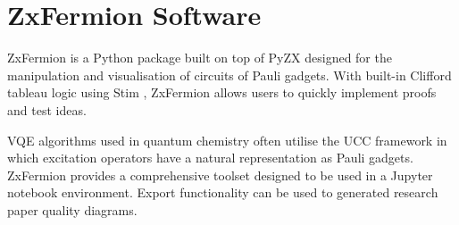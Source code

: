 \chapter{ZxFermion Software}

ZxFermion is a Python package built on top of PyZX \cite{Kissinger2020} designed for the manipulation and visualisation of circuits of Pauli gadgets. With built-in Clifford tableau logic using Stim \cite{Gidney2021}, ZxFermion allows users to quickly implement proofs and test ideas.

VQE algorithms used in quantum chemistry often utilise the UCC framework in which excitation operators have a natural representation as Pauli gadgets. ZxFermion provides a comprehensive toolset designed to be used in a Jupyter notebook environment. Export functionality can be used to generated research paper quality diagrams.
